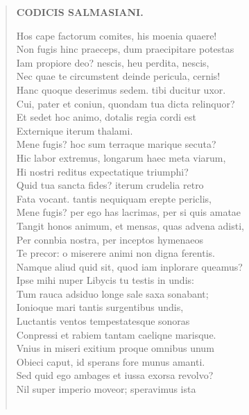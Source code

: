 \documentclass[11pt, a4paper]{report}
\begin{document}
\begin{verse}
    \begin{center} \textbf{CODICIS SALMASIANI.} \end{center} \marginpar{[69]} Hos cape factorum comites, his moenia quaere! \\ Non fugis hinc praeceps, dum praecipitare potestas \\ Iam propiore deo? nescis, heu perdita, nescis, \\ Nec quae te circumstent deinde pericula, cernis! \\ Hanc quoque deserimus sedem. tibi ducitur uxor. \\ Cui, pater et coniun, quondam tua dicta relinquor? \\ Et sedet hoc animo, dotalis regia cordi est \\ Externique iterum thalami. \\ Mene fugis? hoc sum terraque marique secuta? \\ Hic labor extremus, longarum haec meta viarum, \\ Hi nostri reditus expectatique triumphi? \\ Quid tua sancta fides? iterum crudelia retro \\ Fata vocant. tantis nequiquam erepte periclis, \\ Mene fugis? per ego has lacrimas, per si quis amatae \\ Tangit honos animum, et mensas, quas advena adisti, \\ Per connbia nostra, per inceptos hymenaeos \\ Te precor:  \lbrack o \rbrack  miserere animi non digna ferentis. \\ Namque aliud quid sit, quod iam inplorare queamus? \\ Ipse mihi nuper Libycis tu testis in undis: \\ Tum rauca adsiduo longe sale saxa sonabant; \\ Ionioque mari tantis surgentibus undis, \\ Luctantis ventos tempestatesque sonoras \\ Conpressi et rabiem tantam caeliqne marisque. \\ Vnius in miseri exitium proque omnibus unum \\ Obieci caput, id sperans fore munus amanti. \\ Sed quid ego ambages et iussa exorsa revolvo? \\ Nil super imperio moveor; speravimus ista \\ 
        ﻿\pagebreak 

\end{verse}
\end{document}
